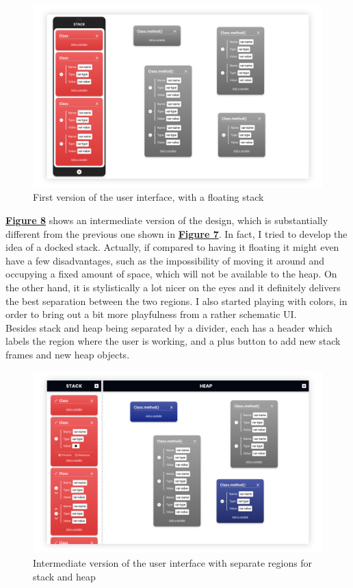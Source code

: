 \documentclass[]{usiinfbachelorproject}
\begin{document}
\begin{figure}[h!]
\centering
\includegraphics[width=\textwidth]{figures/floating_stack.png}
\caption {First version of the user interface, with a floating stack}
\label{floating stack}
\end{figure}

\pagebreak

\noindent \hyperref[separate regions]{\textbf{Figure 8}} shows an intermediate version of the design, which is substantially different from the previous one shown in \hyperref[floating stack]{\textbf{Figure 7}}. In fact, I tried to develop the idea of a docked stack. Actually, if compared to having it floating it might even have a few disadvantages, such as the impossibility of moving it around and occupying a fixed amount of space, which will not be available to the heap. On the other hand, it is stylistically a lot nicer on the eyes and it definitely delivers the best separation between the two regions. I also started playing with colors, in order to bring out a bit more playfulness from a rather schematic UI.\\
Besides stack and heap being separated by a divider, each has a header which labels the region where the user is working, and a plus button to add new stack frames and new heap objects.

\begin{figure}[h!]
\centering
\includegraphics[width=\textwidth]{figures/separate_regions.png}
\caption {Intermediate version of the user interface with separate regions for stack and heap}
\label{separate regions}
\end{figure}
\end{document}
